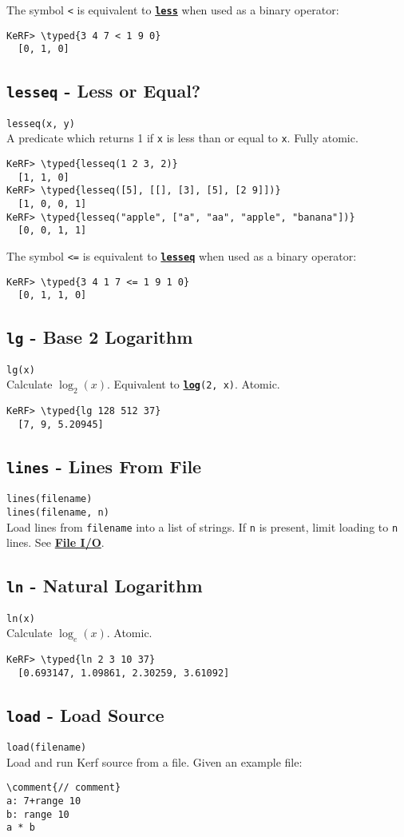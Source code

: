 \documentclass{article}
\newcommand{\typed}[1]{\textcolor{TealBlue}{#1}}
\newcommand{\comment}[1]{\textcolor{Orange}{#1}}
\newcommand{\primdefu}[3]{\subsection{\texttt{#1} - #2}\label{prim:#3}}
\newcommand{\primu}[2]{\hyperref[prim:#2]{\textbf{\texttt{#1}}}}
\newcommand{\primdef}[2]{\primdefu{#1}{#2}{#1}}
\newcommand{\prim}[1]{\primu{#1}{#1}}
\begin{document}
The symbol \texttt{<} is equivalent to \prim{less} when used as a binary operator:
\begin{Verbatim}
KeRF> \typed{3 4 7 < 1 9 0}
  [0, 1, 0]
\end{Verbatim}

\primdef{lesseq}{Less or Equal?}
\texttt{lesseq(x, y)}\\

A predicate which returns 1 if \texttt{x} is less than or equal to \texttt{x}. Fully atomic.
\begin{Verbatim}
KeRF> \typed{lesseq(1 2 3, 2)}
  [1, 1, 0]
KeRF> \typed{lesseq([5], [[], [3], [5], [2 9]])}
  [1, 0, 0, 1]
KeRF> \typed{lesseq("apple", ["a", "aa", "apple", "banana"])}
  [0, 0, 1, 1]
\end{Verbatim}

The symbol \texttt{<=} is equivalent to \prim{lesseq} when used as a binary operator:
\begin{Verbatim}
KeRF> \typed{3 4 1 7 <= 1 9 1 0}
  [0, 1, 1, 0]
\end{Verbatim}

\primdef{lg}{Base 2 Logarithm}
\texttt{lg(x)}\\

Calculate $\log _2(x)$. Equivalent to \texttt{\prim{log}(2, x)}. Atomic.
\begin{Verbatim}
KeRF> \typed{lg 128 512 37}
  [7, 9, 5.20945]
\end{Verbatim}

\primdef{lines}{Lines From File}
\texttt{lines(filename)}\\
\texttt{lines(filename, n)}\\

Load lines from \texttt{filename} into a list of strings. If \texttt{n} is present, limit loading to \texttt{n} lines. See \hyperref[sec:fileio]{\textbf{File I/O}}.

\primdef{ln}{Natural Logarithm}
\texttt{ln(x)}\\

Calculate $\log _e(x)$. Atomic.
\begin{Verbatim}
KeRF> \typed{ln 2 3 10 37}
  [0.693147, 1.09861, 2.30259, 3.61092]
\end{Verbatim}

\primdef{load}{Load Source}
\texttt{load(filename)}\\

Load and run Kerf source from a file. Given an example file:
\begin{Verbatim}
\comment{// comment}
a: 7+range 10
b: range 10
a * b
\end{Verbatim}
\end{document}
